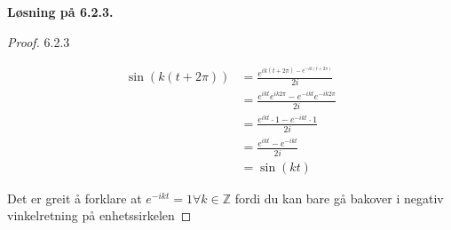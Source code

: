 \documentclass[a4paper,norsk]{article}
\newenvironment{oppgave}[1]%
	{\trivlist{}\item\relax\textbf{Løsning på #1.}\medspace}%
	{\endtrivlist}
\begin{document}
\begin{oppgave}{6.2.3}
\begin{proof}{6.2.3}
\begin{itemize}
  
  \begin{align*}
    \sin(k \left(  t + 2 \pi  \right) ) &= \frac{ e^{ik \left( t + 2 \pi  \right) - e^{-ik \left( t + 2 \pi  \right) }  }  }{ 2i }\\
    &= \frac{ e^{ikt} e^{ik2 \pi } - e^{-ikt} e^{-ik 2 \pi } }{ 2i}\\
    &= \frac{ e^{ikt} \cdot 1 - e^{-ikt} \cdot 1 }{ 2i }\\
    &= \frac{ e^{ikt} - e^{-ikt}  }{ 2i }\\
    &= \sin(kt) 
  \end{align*}
\end{itemize}
Det er greit å forklare at $ e^{-ikt} = 1  \forall k \in \mathbb{Z}$ fordi du kan bare gå bakover i negativ vinkelretning på enhetssirkelen
\end{proof}
\end{oppgave}  
\end{document}

